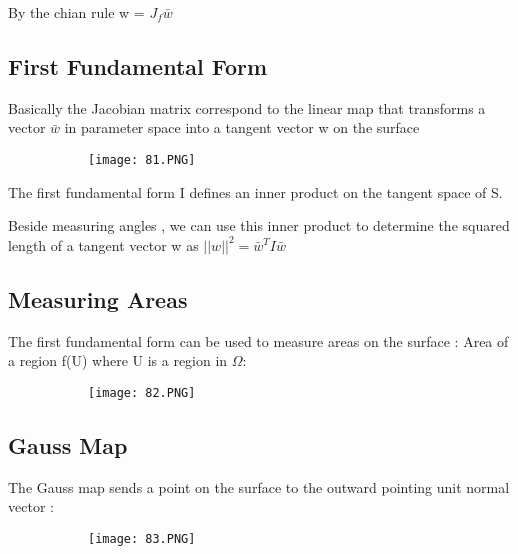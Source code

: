\documentclass{article}
\begin{document}
By the chian rule w = $J_f\bar w$


\subsection{First Fundamental Form}

Basically the Jacobian matrix correspond to the linear map that transforms a vector $\bar w$ in parameter space into a tangent vector w on the surface


    \begin{figure}[ht!]
  \centering
  \begin{subfigure}[b]{0.5\linewidth}
    \texttt{[image: 81.PNG]}
  \end{subfigure}
\end{figure}

The first fundamental form I defines an inner product on the tangent space of S.

Beside measuring angles , we can use this inner product to determine the squared length of a tangent vector w as $||w||^2 = \bar w^TI\bar w$

\subsection{Measuring Areas}

The first fundamental form can be used to measure areas on the surface : Area of a region f(U) where U is a region in $\Omega$:

    \begin{figure}[ht!]
  \centering
  \begin{subfigure}[b]{0.5\linewidth}
    \texttt{[image: 82.PNG]}
  \end{subfigure}
\end{figure}

\subsection{Gauss Map}

The Gauss map sends a point on the surface to the outward pointing unit normal vector :

    \begin{figure}[ht!]
  \centering
  \begin{subfigure}[b]{0.5\linewidth}
    \texttt{[image: 83.PNG]}
  \end{subfigure}
\end{figure}
\end{document}
